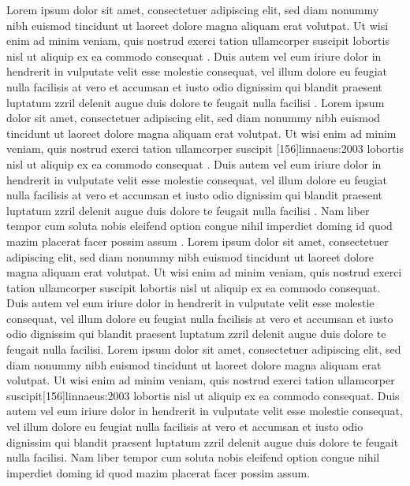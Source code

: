 \documentclass[a4paper,12pt]{scrartcl}
\begin{document}
{Lorem ipsum dolor sit amet, consectetuer adipiscing elit, sed diam nonummy nibh euismod tincidunt ut laoreet dolore magna aliquam erat volutpat. Ut wisi enim ad minim veniam, quis nostrud exerci tation ullamcorper suscipit lobortis nisl ut aliquip ex ea commodo consequat \autocite{auler:hiller:2015}. Duis autem vel eum iriure dolor in hendrerit in vulputate velit esse molestie consequat, vel illum dolore eu feugiat nulla facilisis at vero et accumsan et iusto odio dignissim qui blandit praesent luptatum zzril delenit augue duis dolore te feugait nulla facilisi \autocites[68]{auler:hiller:2011}[48]{auler:hiller:2015a}[159--187]{auler:hiller:2015}[40--41]{auler:hiller:2016}[15--23]{tacitus:1981}[19]{de:neck:yoder:1978}[69]{auler:hiller:2011}. Lorem ipsum dolor sit amet, consectetuer adipiscing elit, sed diam nonummy nibh euismod tincidunt ut laoreet dolore magna aliquam erat volutpat. Ut wisi enim ad minim veniam, quis nostrud exerci tation ullamcorper suscipit [156]{linnaeus:2003} lobortis nisl ut aliquip ex ea commodo consequat \autocite{kenmore}. Duis autem vel eum iriure dolor in hendrerit in vulputate velit esse molestie consequat, vel illum dolore eu feugiat nulla facilisis at vero et accumsan et iusto odio dignissim qui blandit praesent luptatum zzril delenit augue duis dolore te feugait nulla facilisi \autocite{kenmore}. Nam liber tempor cum soluta nobis eleifend option congue nihil imperdiet doming id quod mazim placerat facer possim assum \autocite[145--146]{todorova:et:al:1981}.}
{Lorem ipsum dolor sit amet, consectetuer adipiscing elit, sed diam nonummy nibh euismod tincidunt ut laoreet dolore magna aliquam erat volutpat. Ut wisi enim ad minim veniam, quis nostrud exerci tation ullamcorper suscipit lobortis nisl ut aliquip ex ea commodo consequat.\autocite{auler:hiller:2015} Duis autem vel eum iriure dolor in hendrerit in vulputate velit esse molestie consequat, vel illum dolore eu feugiat nulla facilisis at vero et accumsan et iusto odio dignissim qui blandit praesent luptatum zzril delenit augue duis dolore te feugait nulla facilisi.\autocites[68]{auler:hiller:2011}[48]{auler:hiller:2015a}[159--187]{auler:hiller:2015}[40--41]{auler:hiller:2016}[15--23]{tacitus:1981}[19]{de:neck:yoder:1978}[69]{auler:hiller:2011} Lorem ipsum dolor sit amet, consectetuer adipiscing elit, sed diam nonummy nibh euismod tincidunt ut laoreet dolore magna aliquam erat volutpat. Ut wisi enim ad minim veniam, quis nostrud exerci tation ullamcorper suscipit[156]{linnaeus:2003} lobortis nisl ut aliquip ex ea commodo consequat.\autocite{kenmore} Duis autem vel eum iriure dolor in hendrerit in vulputate velit esse molestie consequat, vel illum dolore eu feugiat nulla facilisis at vero et accumsan et iusto odio dignissim qui blandit praesent luptatum zzril delenit augue duis dolore te feugait nulla facilisi.\autocite{kenmore} Nam liber tempor cum soluta nobis eleifend\autocite[41--43]{auler:hiller:2015} option congue nihil imperdiet\autocite[19]{de:neck:yoder:1978} doming id quod mazim placerat facer possim assum.\autocite[145--146]{todorova:et:al:1981}}
\end{document}
